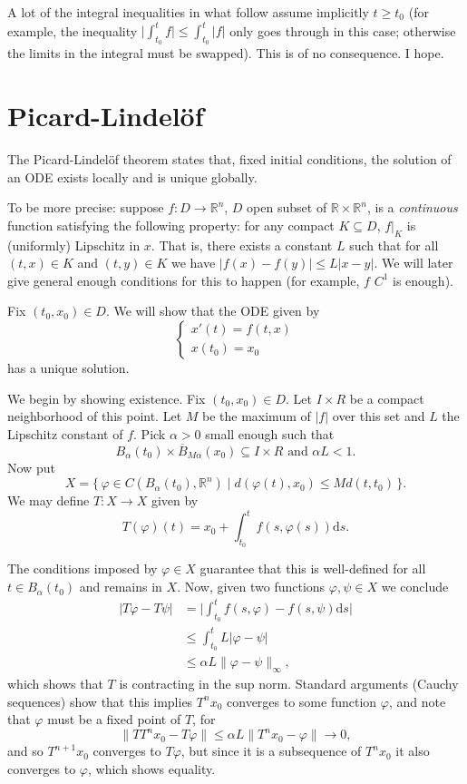 \documentclass{article}
\newcommand{\R}{\mathbb{R}}
\newcommand{\dd}{\mathrm{d}}
\begin{document}
A lot of the integral inequalities in what follow assume implicitly $t \geq t_0$ (for example, the inequality $\lvert \int_{t_0}^t f \lvert \leq \int_{t_0}^t \lvert f \rvert$ only goes through in this case; otherwise the limits in the integral must be swapped). This is of no consequence. I hope.

\section{Picard-Lindelöf}

The Picard-Lindelöf theorem states that, fixed initial conditions, the solution of an ODE exists locally and is unique globally.

To be more precise: suppose $f : D \to \R^n$, $D$ open subset of $\R \times \R^n$, is a \emph{continuous} function satisfying the following property: for any compact $K \subseteq D$, $f|_K$ is (uniformly) Lipschitz in $x$. That is, there exists a constant $L$ such that for all $(t,x) \in K$ and $(t, y) \in K$ we have $\lvert f(x) - f(y) \rvert \leq L \lvert x - y \rvert$. We will later give general enough conditions for this to happen (for example, $f$ $C^1$ is enough).

Fix $(t_0, x_0) \in D$. We will show that the ODE given by
\begin{equation}\label{ode}
\begin{cases}
x'(t) = f(t, x)\\
x(t_0) = x_0
\end{cases}
\end{equation}
has a unique solution.

We begin by showing existence. Fix $(t_0, x_0) \in D$. Let $I \times R$ be a compact neighborhood of this point. Let $M$ be the maximum of $\lvert f \rvert$ over this set and $L$ the Lipschitz constant of $f$. Pick $\alpha > 0$ small enough such that
\[B_\alpha(t_0) \times \overline B_{M \alpha}(x_0) \subseteq I \times R \text{ and } \alpha L < 1.\]
Now put
\[X = \{\, \varphi \in C(B_\alpha(t_0), \R^n) \mid d(\varphi(t), x_0) \leq M d(t, t_0)\,\}.\]
We may define $T : X \to X$ given by
\[T(\varphi)(t) = x_0 + \int_{t_0}^t f(s, \varphi(s)) \dd s.\]

The conditions imposed by $\varphi \in X$ guarantee that this is well-defined for all $t \in B_\alpha(t_0)$ and remains in $X$. Now, given two functions $\varphi, \psi \in X$ we conclude
\begin{align*}
\lvert T \varphi - T\psi \rvert &= \lvert \int_{t_0}^t f(s, \varphi) - f(s, \psi) \dd s \rvert\\
&\leq \int_{t_0}^t L \lvert \varphi - \psi \rvert\\
&\leq \alpha L \lVert \varphi - \psi \rVert_\infty,
\end{align*}
which shows that $T$ is contracting in the sup norm. Standard arguments (Cauchy sequences) show that this implies $T^n x_0$ converges to some function $\varphi$, and note that $\varphi$ must be a fixed point of $T$, for
\[\lVert T T^n x_0 - T \varphi \rVert \leq \alpha L \lVert T^n x_0 - \varphi \rVert \to 0,\]
and so $T^{n+1} x_0$ converges to $T \varphi$, but since it is a subsequence of $T^n x_0$ it also converges to $\varphi$, which shows equality.
\end{document}
